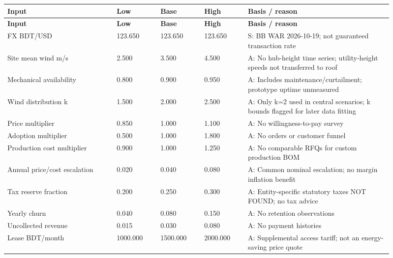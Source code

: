 \documentclass[11pt,a4paper]{article}
\begin{document}
{\footnotesize
\setlength{\tabcolsep}{3pt}\renewcommand{\arraystretch}{1.18}
\begin{longtable}{@{}>{\raggedright\arraybackslash}p{0.2505\linewidth}>{\raggedright\arraybackslash}p{0.1085\linewidth}>{\raggedright\arraybackslash}p{0.1085\linewidth}>{\raggedright\arraybackslash}p{0.1085\linewidth}>{\raggedright\arraybackslash}p{0.3339\linewidth}@{}}
\toprule \textbf{Input} & \textbf{Low} & \textbf{Base} & \textbf{High} & \textbf{Basis / reason} \\ \midrule
\endfirsthead\toprule \textbf{Input} & \textbf{Low} & \textbf{Base} & \textbf{High} & \textbf{Basis / reason} \\ \midrule
\endhead\bottomrule\endfoot
FX BDT/USD & \num{123.650} & \num{123.650} & \num{123.650} & S: BB WAR 2026-10-19; not guaranteed transaction rate \\
Site mean wind m/s & \num{2.500} & \num{3.500} & \num{4.500} & A: No hub-height time series; utility-height speeds not transferred to roof \\
Mechanical availability & \num{0.800} & \num{0.900} & \num{0.950} & A: Includes maintenance/curtailment; prototype uptime unmeasured \\
Wind distribution k & \num{1.500} & \num{2.000} & \num{2.500} & A: Only k=2 used in central scenarios; k bounds flagged for later data fitting \\
Price multiplier & \num{0.850} & \num{1.000} & \num{1.100} & A: No willingness-to-pay survey \\
Adoption multiplier & \num{0.500} & \num{1.000} & \num{1.800} & A: No orders or customer funnel \\
Production cost multiplier & \num{0.900} & \num{1.000} & \num{1.250} & A: No comparable RFQs for custom production BOM \\
Annual price/cost escalation & \num{0.020} & \num{0.040} & \num{0.080} & A: Common nominal escalation; no margin inflation benefit \\
Tax reserve fraction & \num{0.200} & \num{0.250} & \num{0.300} & A: Entity-specific statutory taxes NOT FOUND; no tax advice \\
Yearly churn & \num{0.040} & \num{0.080} & \num{0.150} & A: No retention observations \\
Uncollected revenue & \num{0.015} & \num{0.030} & \num{0.080} & A: No payment histories \\
Lease BDT/month & \num{1000.000} & \num{1500.000} & \num{2000.000} & A: Supplemental access tariff; not an energy-saving price quote \\

\end{longtable}}
\end{document}
